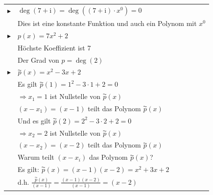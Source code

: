 \begin{tabular}[t]{ll}%
	$\blacktriangleright$ & $ \deg(7+\mathrm{i})=\deg((7+\mathrm{i})\cdot x^0)=0 $  \\
	& Dies ist eine konstante Funktion und auch ein Polynom mit $ x^0 $\vspace*{2mm} \\
	$ \blacktriangleright $	& $ p(x)=7x^2+2 $\\
	&Höchste Koeffizient ist 7\\
	&Der Grad von $ p=\deg(2) $\vspace*{2mm}\\
	$\blacktriangleright$ & $\overset{\AC}{p}(x)=x^2-3x+2$\\
	&Es gilt  $\overset{\AC}{p}(1)=1^2-3\cdot 1+2=0$\\
	&$\Rightarrow x_1=1$ ist Nullstelle von $\overset{\AC}{p}(x)  $\\
	&$ (x-x_1)=(x-1)$ teilt das Polynom $\overset{\AC}{p}(x)  $\\
	&Und es gilt  $\overset{\AC}{p}(2)=2^2-3\cdot 2+2=0$\\
    &$\Rightarrow x_2=2$ ist Nullstelle von $\overset{\AC}{p}(x)  $\\
  &$ (x-x_2)=(x-2)$ teilt das Polynom $\overset{\AC}{p}(x)  $\\
& Warum teilt $ (x-x_i) $ das Polynom $\overset{\AC}{p}(x)  $?\\
&Es gilt: $ \overset{\AC}{p}(x)=(x-1)(x-2)=x^2+3x+2 $\\
&d.h. $ \frac{\overset{\AC}{p}(x)}{(x-1)}=\frac{(x-1)(x-2)}{(x-1)}=(x-2) $
\end{tabular} \\
